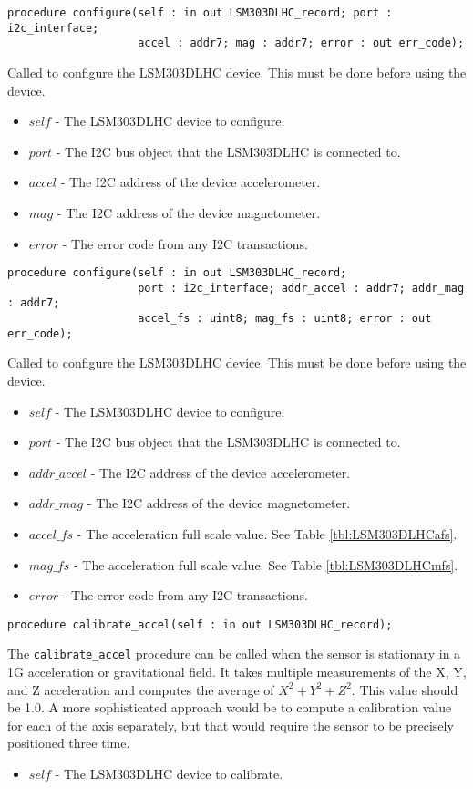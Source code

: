 \documentclass[10pt, openany]{book}
\newcommand{\indexfunc}[1]{\index[func]{#1}}
\newcommand{\function}[1]{\texttt{#1}}
\begin{document}
\begin{lstlisting}
procedure configure(self : in out LSM303DLHC_record; port : i2c_interface;
                    accel : addr7; mag : addr7; error : out err_code);
\end{lstlisting}
\indexfunc{configure}
Called to configure the LSM303DLHC device.  This must be done before using the device.
\begin{itemize}
  \item $self$ - The LSM303DLHC device to configure.
  \item $port$ - The I2C bus object that the LSM303DLHC is connected to.
  \item $accel$ - The I2C address of the device accelerometer.
  \item $mag$ - The I2C address of the device magnetometer.
  \item $error$ - The error code from any I2C transactions.
\end{itemize}

\begin{lstlisting}
procedure configure(self : in out LSM303DLHC_record;
                    port : i2c_interface; addr_accel : addr7; addr_mag : addr7;
                    accel_fs : uint8; mag_fs : uint8; error : out err_code);
\end{lstlisting}
\indexfunc{configure}
Called to configure the LSM303DLHC device.  This must be done before using the device.
\begin{itemize}
  \item $self$ - The LSM303DLHC device to configure.
  \item $port$ - The I2C bus object that the LSM303DLHC is connected to.
  \item $addr\_accel$ - The I2C address of the device accelerometer.
  \item $addr\_mag$ - The I2C address of the device magnetometer.
  \item $accel\_fs$ - The acceleration full scale value.  See Table \ref{tbl:LSM303DLHCafs}.
  \item $mag\_fs$ - The acceleration full scale value.  See Table \ref{tbl:LSM303DLHCmfs}.
  \item $error$ - The error code from any I2C transactions.
\end{itemize}

\begin{lstlisting}
procedure calibrate_accel(self : in out LSM303DLHC_record);
\end{lstlisting}
\indexfunc{calibrate\_accel}
The \function{calibrate\_accel} procedure can be called when the sensor is stationary in a 1G acceleration or gravitational field.  It takes multiple measurements of the X, Y, and Z acceleration and computes the average of $X^2 + Y^2 + Z^2$.  This value should be 1.0.  A more sophisticated approach would be to compute a calibration value for each of the axis separately, but that would require the sensor to be precisely positioned three time.
\begin{itemize}
  \item $self$ - The LSM303DLHC device to calibrate.
\end{itemize}
\end{document}
